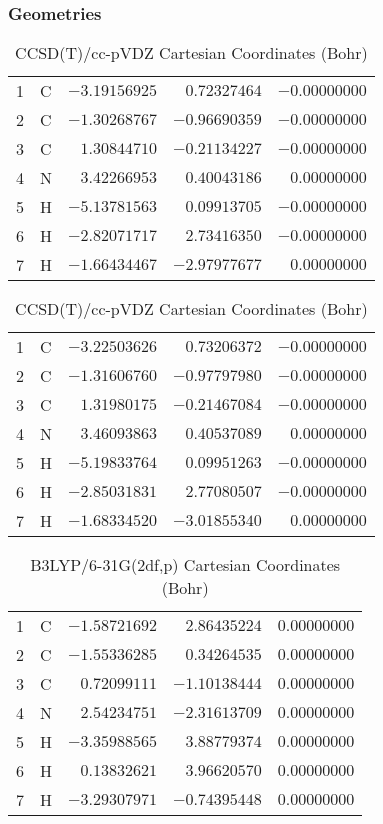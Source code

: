 \documentclass[10pt,oneside]{article}
\begin{document}
\begin{table}[h!]
\subsubsection*{Geometries}
\begin{multicols}{2}
\centering
\caption{CCSD(T)/cc-pVTZ Cartesian Coordinates (Bohr)}
\begin{tabular}{llrrr}
\toprule
1  & C  & $-3.19156925$ & $ 0.72327464$ & $-0.00000000$ \\
2  & C  & $-1.30268767$ & $-0.96690359$ & $-0.00000000$ \\
3  & C  & $ 1.30844710$ & $-0.21134227$ & $-0.00000000$ \\
4  & N  & $ 3.42266953$ & $ 0.40043186$ & $ 0.00000000$ \\
5  & H  & $-5.13781563$ & $ 0.09913705$ & $-0.00000000$ \\
6  & H  & $-2.82071717$ & $ 2.73416350$ & $-0.00000000$ \\
7  & H  & $-1.66434467$ & $-2.97977677$ & $ 0.00000000$ \\
\bottomrule
\end{tabular}
\caption{CCSD(T)/cc-pVDZ Cartesian Coordinates (Bohr)}
\begin{tabular}{llrrr}
\toprule
1  & C  & $-3.22503626$ & $ 0.73206372$ & $-0.00000000$ \\
2  & C  & $-1.31606760$ & $-0.97797980$ & $-0.00000000$ \\
3  & C  & $ 1.31980175$ & $-0.21467084$ & $-0.00000000$ \\
4  & N  & $ 3.46093863$ & $ 0.40537089$ & $ 0.00000000$ \\
5  & H  & $-5.19833764$ & $ 0.09951263$ & $-0.00000000$ \\
6  & H  & $-2.85031831$ & $ 2.77080507$ & $-0.00000000$ \\
7  & H  & $-1.68334520$ & $-3.01855340$ & $ 0.00000000$ \\
\bottomrule
\end{tabular}
\end{multicols}
\end{table}

\begin{table}[h]
\centering
\caption{B3LYP/6-31G(2df,p) Cartesian Coordinates (Bohr)}
\begin{tabular}{llrrr}
\toprule
1  & C  & $-1.58721692$ & $ 2.86435224$ & $ 0.00000000$ \\
2  & C  & $-1.55336285$ & $ 0.34264535$ & $ 0.00000000$ \\
3  & C  & $ 0.72099111$ & $-1.10138444$ & $ 0.00000000$ \\
4  & N  & $ 2.54234751$ & $-2.31613709$ & $ 0.00000000$ \\
5  & H  & $-3.35988565$ & $ 3.88779374$ & $ 0.00000000$ \\
6  & H  & $ 0.13832621$ & $ 3.96620570$ & $ 0.00000000$ \\
7  & H  & $-3.29307971$ & $-0.74395448$ & $ 0.00000000$ \\
\bottomrule
\end{tabular}
\end{table}
\end{document}
